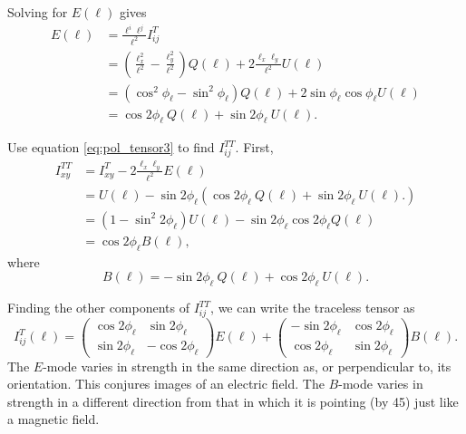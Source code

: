 Solving for $E(\bm{\ell})$ gives 
\begin{align}
    \nonumber E(\bm{\ell}) &= \frac{\ell^i \ell^j}{\ell^2}I^T_{ij} \\
    \nonumber &= (\frac{\ell_x^2}{\ell^2} - \frac{\ell_y^2}{\ell^2})Q(\bm{\ell}) + 2 \frac{\ell_x\ell_y}{\ell^2}U(\bm{\ell}) \\
    &= (\cos^2\phi_\ell - \sin^2\phi_\ell)Q(\bm{\ell}) + 2\sin\phi_\ell\cos\phi_\ell U(\bm{\ell}) \\
    \label{eq:pol_emode}
    &= \cos2\phi_\ell~ Q(\bm{\ell}) + \sin2\phi_\ell~ U(\bm{\ell}).
\end{align}

Use equation \ref{eq:pol_tensor3} to find $I^{TT}_{ij}$. First,
\begin{align}
    \nonumber I^{TT}_{xy} &= I^T_{xy} - 2\frac{\ell_x\ell_y}{\ell^2} E(\bm{\ell}) \\
    \nonumber &= U(\bm{\ell}) - \sin2\phi_\ell (\cos2\phi_\ell~ Q(\bm{\ell}) + \sin2\phi_\ell~ U(\bm{\ell}).) \\
    \nonumber &= (1 - \sin^2 2\phi_\ell)U(\bm{\ell}) - \sin 2\phi_\ell \cos 2\phi_\ell Q(\bm{\ell}) \\
    &= \cos 2\phi_\ell B(\bm{\ell}),
\end{align}
where
\begin{equation}
    \label{eq:pol_bmode}
    B(\bm{\ell}) = -\sin 2\phi_\ell ~Q(\bm{\ell}) + \cos 2\phi_\ell ~U(\bm{\ell}).
\end{equation}

Finding the other components of $I^{TT}_{ij}$, we can write the traceless tensor as
\begin{equation}
    \label{eq:pol_tensor4}
    I^T_{ij}(\bm{\ell}) = \begin{pmatrix}
        \cos2\phi_\ell & \sin2\phi_\ell \\
        \sin2\phi_\ell & -\cos2\phi_\ell
    \end{pmatrix} E(\bm{\ell}) + \begin{pmatrix}
        -\sin2\phi_\ell & \cos2\phi_\ell \\
        \cos2\phi_\ell & \sin2\phi_\ell
    \end{pmatrix} B(\bm{\ell}).
\end{equation}
The $E$-mode varies in strength in the same direction as, or perpendicular to, its orientation. This conjures images of an electric field. The $B$-mode varies in strength in a different direction from that in which it is pointing (by 45\textdegree) just like a magnetic field.
